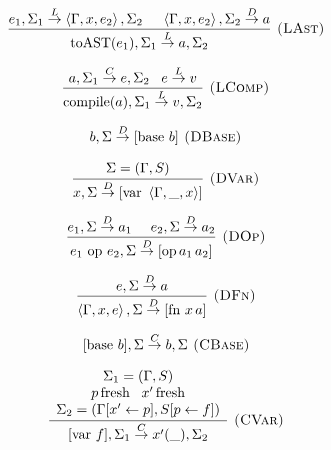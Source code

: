 \documentclass[english]{llncs}
\begin{document}
\begin{figure}[t!]
\begin{minipage}[t]{0.59\columnwidth}
{\footnotesize{}
\[
\frac{e_{1},\Sigma_{1}\overset{L}{\rightarrow}\left\langle \Gamma,x,e_{2}\right\rangle ,\Sigma_{2}\,\,\,\,\,\,\,\,\left\langle \Gamma,x,e_{2}\right\rangle ,\Sigma_{2}\overset{D}{\rightarrow}a}{\mbox{toAST(\ensuremath{e_{1}})},\Sigma_{1}\overset{L}{\rightarrow}a,\Sigma_{2}}\textsc{ (LAst)}
\]
}{\footnotesize \par}

{\footnotesize{}
\[
\frac{a,\Sigma_{1}\overset{C}{\rightarrow}e,\Sigma_{2}\,\,\,\,\, e\overset{L}{\rightarrow}v}{\mbox{compile(\ensuremath{a})},\Sigma_{1}\overset{L}{\rightarrow}v,\Sigma_{2}}\textsc{ (LComp)}
\]
}%
\end{minipage}{\footnotesize{}}%
\begin{minipage}[t]{0.4\columnwidth}%
{\footnotesize{}
\[
b,\Sigma\overset{D}{\rightarrow}[\mbox{base }b]\textsc{ (DBase)}
\]
}{\footnotesize \par}

{\footnotesize{}
\[
\frac{\begin{array}[t]{c}
\Sigma=(\Gamma,S)\end{array}}{x,\Sigma\overset{D}{\rightarrow}[\mbox{var }\left\langle \Gamma,\_,x\right\rangle ]}\textsc{ (DVar)}
\]
}{\footnotesize \par}

{\footnotesize{}
\[
\frac{e_{1},\Sigma\overset{D}{\rightarrow}a_{1}\,\,\,\,\,\,\,\, e_{2},\Sigma\overset{D}{\rightarrow}a_{2}}{e_{1}\mbox{ op }e_{2},\Sigma\overset{D}{\rightarrow}[\mbox{op\,\ensuremath{a_{1}\,}\ensuremath{a_{2}}}]}\textsc{ (DOp)}
\]
}{\footnotesize \par}

{\footnotesize{}
\[
\frac{e,\Sigma\overset{D}{\rightarrow}a}{\left\langle \Gamma,x,e\right\rangle ,\Sigma\overset{D}{\rightarrow}[\mbox{fn }x\, a]}\textsc{ (DFn)}
\]
}{\footnotesize \par}

{\footnotesize{}
\[
[\mbox{base \ensuremath{b}}],\Sigma\overset{C}{\rightarrow}b,\Sigma\textsc{ (CBase)}
\]
}{\footnotesize \par}

{\footnotesize{}
\[
\frac{\begin{array}[t]{c}
\Sigma_{1}=(\Gamma,S)\\
p\,\mbox{fresh}\,\,\,\,\, x'\,\mbox{fresh}\\
\Sigma_{2}=(\Gamma[x'\leftarrow p],S[p\leftarrow f])
\end{array}}{[\mbox{var }f],\Sigma_{1}\overset{C}{\rightarrow}x'(\_),\Sigma_{2}}\textsc{ (CVar)}
\]
}{\footnotesize \par}


\end{minipage}
\end{figure}
\end{document}
